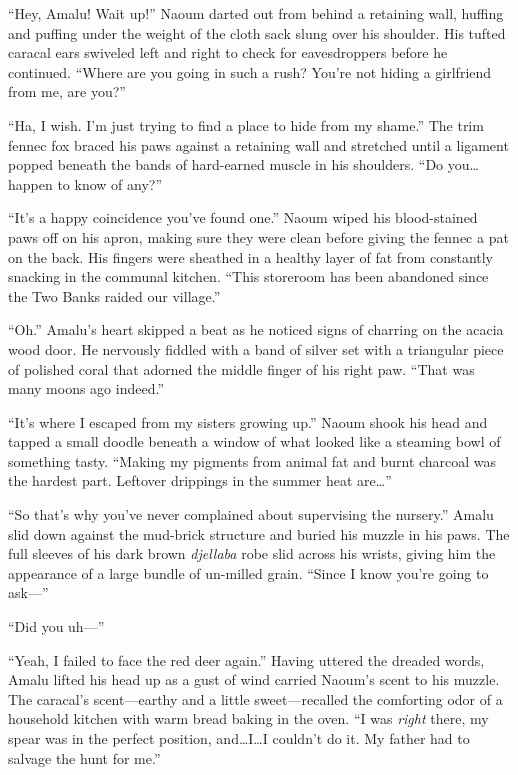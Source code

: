``Hey, Amalu! Wait up!'' Naoum darted out from behind a retaining wall, huffing and puffing under the weight of the cloth sack slung over his shoulder. His tufted caracal ears swiveled left and right to check for eavesdroppers before he continued. ``Where are you going in such a rush? You're not hiding a girlfriend from me, are you?''

``Ha, I wish. I'm just trying to find a place to hide from my shame.'' The trim fennec fox braced his paws against a retaining wall and stretched until a ligament popped beneath the bands of hard-earned muscle in his shoulders. ``Do you\ldots happen to know of any?''

``It's a happy coincidence you've found one.'' Naoum wiped his blood-stained paws off on his apron, making sure they were clean before giving the fennec a pat on the back. His fingers were sheathed in a healthy layer of fat from constantly snacking in the communal kitchen. ``This storeroom has been abandoned since the Two Banks raided our village.''

``Oh.'' Amalu's heart skipped a beat as he noticed signs of charring on the acacia wood door. He nervously fiddled with a band of silver set with a triangular piece of polished coral that adorned the middle finger of his right paw. ``That was many moons ago indeed.''

``It's where I escaped from my sisters growing up.'' Naoum shook his head and tapped a small doodle beneath a window of what looked like a steaming bowl of something tasty. ``Making my pigments from animal fat and burnt charcoal was the hardest part. Leftover drippings in the summer heat are\ldots''

``So that's why you've never complained about supervising the nursery.'' Amalu slid down against the mud-brick structure and buried his muzzle in his paws. The full sleeves of his dark brown \emph{djellaba} robe slid across his wrists, giving him the appearance of a large bundle of un-milled grain. ``Since I know you're going to ask---''

``Did you uh---''

``Yeah, I failed to face the red deer again.'' Having uttered the dreaded words, Amalu lifted his head up as a gust of wind carried Naoum's scent to his muzzle. The caracal's scent---earthy and a little sweet---recalled the comforting odor of a household kitchen with warm bread baking in the oven. ``I was \emph{right} there, my spear was in the perfect position, and\ldots I\ldots I couldn't do it. My father had to salvage the hunt for me.''

